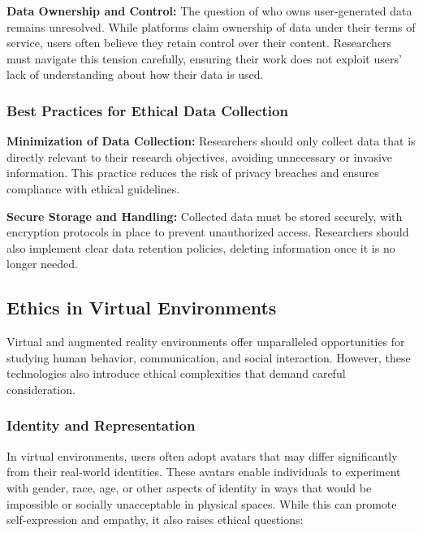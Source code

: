 \documentclass[
]{book}
\begin{document}
\textbf{Data Ownership and Control:} The question of who owns user-generated data remains unresolved. While platforms claim ownership of data under their terms of service, users often believe they retain control over their content. Researchers must navigate this tension carefully, ensuring their work does not exploit users' lack of understanding about how their data is used.

\subsubsection{Best Practices for Ethical Data Collection}\label{best-practices-for-ethical-data-collection}

\textbf{Minimization of Data Collection:} Researchers should only collect data that is directly relevant to their research objectives, avoiding unnecessary or invasive information. This practice reduces the risk of privacy breaches and ensures compliance with ethical guidelines.

\textbf{Secure Storage and Handling:} Collected data must be stored securely, with encryption protocols in place to prevent unauthorized access. Researchers should also implement clear data retention policies, deleting information once it is no longer needed.

\subsection{Ethics in Virtual Environments}\label{ethics-in-virtual-environments}

Virtual and augmented reality environments offer unparalleled opportunities for studying human behavior, communication, and social interaction. However, these technologies also introduce ethical complexities that demand careful consideration.

\subsubsection{\texorpdfstring{\textbf{Identity and Representation}}{Identity and Representation}}\label{identity-and-representation}

In virtual environments, users often adopt avatars that may differ significantly from their real-world identities. These avatars enable individuals to experiment with gender, race, age, or other aspects of identity in ways that would be impossible or socially unacceptable in physical spaces. While this can promote self-expression and empathy, it also raises ethical questions:
\end{document}
